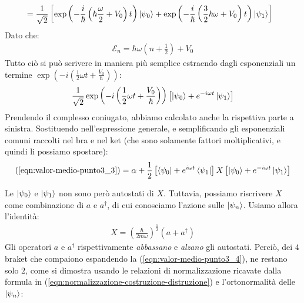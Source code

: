 \documentclass[../../FisicaTeorica.tex]{subfiles}
\begin{document}
\begin{enumerate}
\begin{align*}
\\
\span= \frac{1}{\sqrt{2}} \left[
\exp\left({-\frac{i}{\hbar}\left(\hbar\frac{\omega}{2} + V_0\right)t}\right)\ket{\psi_0} +
\exp\left({-\frac{i}{\hbar}\left(\frac{3}{2}\hbar \omega + V_0\right)t}\right)\ket{\psi_1}
\right]
\end{align*}
Dato che:
\begin{align*}
\mathcal{E}_n = \hbar \omega \left(n+\frac{1}{2}\right) + V_0
\end{align*}
Tutto ciò si può scrivere in maniera più semplice estraendo dagli esponenziali un termine $\exp\left(-i\left(\frac{1}{2}\omega t+\frac{V_0}{\hbar}\right)\right)$:
\begin{align*}
\frac{1}{\sqrt{2}}\exp\left(-i\left(\frac{1}{2}\omega t+\frac{V_0}{\hbar}\right)\right)\left[ \Ket{\psi_0} +e^{-i\omega t} \Ket{\psi_1}\right]
\end{align*}
Prendendo il complesso coniugato, abbiamo calcolato anche la rispettiva parte a sinistra. Sostituendo nell'espressione generale, e semplificando gli esponenziali comuni raccolti nel bra e nel ket (che sono solamente fattori moltiplicativi, e quindi li possiamo spostare):
\begin{align}
(\ref{eqn:valor-medio-punto3_3}) =\alpha + \frac{1}{2}\left[ \Bra{\psi_0} + e^{i\omega t}\Bra{\psi_1}
\right] X \left[ \Ket{\psi_0} +e^{-i\omega t}\Ket{\psi_1}\right]
\label{eqn:valor-medio-punto3_4}
\end{align}
\begin{comment}
\begin{align}\nonumber
(\ref{eqn:valor-medio-punto3_3}) = \alpha +\frac{1}{2}\left[\exp\left(\frac{i}{\hbar}\left(\hbar \frac{\omega}{2}+ V_0\right)t \right)\bra{\psi_0}+\exp\left(\frac{i}{\hbar}\left(\frac{3}{2}\hbar \omega + V_0\right)t\right)\bra{\psi_1}\right] X\\
\left[\exp\left(-\frac{i}{\hbar}\left(\hbar \frac{\omega}{2}+V_0\right)t\right) \ket{\psi_0} + \exp\left(-\frac{i}{\hbar}\left(\frac{3}{2}\hbar \omega + V_0\right) t \right)\ket{\psi_1}\right]
\end{align}
\end{comment}
Le $\Ket{\psi_0}$ e $\Ket{\psi_1}$ non sono però autostati di $X$. Tuttavia, possiamo riscrivere $X$ come combinazione di $a$ e $a^\dag$, di cui conosciamo l'azione sulle $\Ket{\psi_n}$. Usiamo allora l'identità:
\begin{align*}
X=\left(\frac{\hbar}{2m\omega}\right)^{\frac{1}{2}} (a+a^\dag)
\end{align*}
Gli operatori $a$ e $a^\dag$ rispettivamente \textit{abbassano} e \textit{alzano} gli autostati. Perciò, dei $4$ braket che compaiono espandendo la (\ref{eqn:valor-medio-punto3_4}), ne restano solo $2$, come si dimostra usando le relazioni di normalizzazione ricavate dalla formula in (\ref{eqn:normalizzazione-costruzione-distruzione}) e l'ortonormalità delle $\Ket{\psi_n}$:

\end{enumerate}
\end{document}
